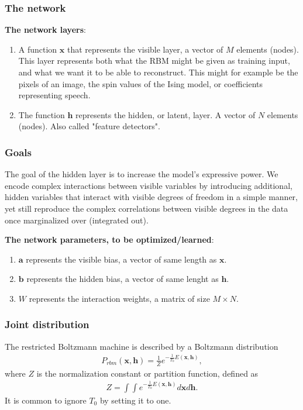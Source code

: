 \documentclass{beamer}
\begin{document}
\begin{frame}
\frametitle{The network}

\textbf{The network layers}:
\begin{enumerate}
 \item A function $\mathbf{x}$ that represents the visible layer, a vector of $M$ elements (nodes). This layer represents both what the RBM might be given as training input, and what we want it to be able to reconstruct. This might for example be the pixels of an image, the spin values of the Ising model, or coefficients representing speech.

 \item The function $\mathbf{h}$ represents the hidden, or latent, layer. A vector of $N$ elements (nodes). Also called "feature detectors".
\end{enumerate}

\noindent
\end{frame}

\begin{frame}
\frametitle{Goals}

The goal of the hidden layer is to increase the model's expressive
power. We encode complex interactions between visible variables by
introducing additional, hidden variables that interact with visible
degrees of freedom in a simple manner, yet still reproduce the complex
correlations between visible degrees in the data once marginalized
over (integrated out).

\textbf{The network parameters, to be optimized/learned}:
\begin{enumerate}
 \item $\mathbf{a}$ represents the visible bias, a vector of same length as $\mathbf{x}$.

 \item $\mathbf{b}$ represents the hidden bias, a vector of same lenght as $\mathbf{h}$.

 \item $W$ represents the interaction weights, a matrix of size $M\times N$.
\end{enumerate}

\noindent
\end{frame}

\begin{frame}
\frametitle{Joint distribution}

The restricted Boltzmann machine is described by a Boltzmann distribution
\begin{align}
	P_{rbm}(\mathbf{x},\mathbf{h}) = \frac{1}{Z} e^{-\frac{1}{T_0}E(\mathbf{x},\mathbf{h})},
\end{align}
where $Z$ is the normalization constant or partition function, defined as 
\begin{align}
	Z = \int \int e^{-\frac{1}{T_0}E(\mathbf{x},\mathbf{h})} d\mathbf{x} d\mathbf{h}.
\end{align}
It is common to ignore $T_0$ by setting it to one.
\end{frame}
\end{document}
